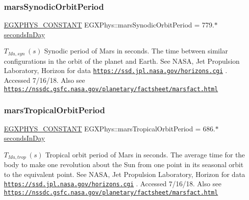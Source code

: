 \subsubsection{\texorpdfstring{mars\+Synodic\+Orbit\+Period}{marsSynodicOrbitPeriod}}
{\footnotesize\ttfamily \mbox{\hyperlink{group___e_g_x_phys-_constants-_macros_ga76980d288494ce1714c9ac68a95ba702}{E\+G\+X\+P\+H\+Y\+S\+\_\+\+C\+O\+N\+S\+T\+A\+NT}} E\+G\+X\+Phys\+::mars\+Synodic\+Orbit\+Period = 779.$\ast$\mbox{\hyperlink{namespace_e_g_x_phys_a93d2a00d75411b58cbf63ab3fd1f8bc2}{seconds\+In\+Day}}}

$ T_{Ma,syn} \ (s)$ Synodic period of Mars in seconds. The time between similar configurations in the orbit of the planet and Earth. See N\+A\+SA, Jet Propulsion Laboratory, Horizon for data \href{https://ssd.jpl.nasa.gov/horizons.cgi}{\tt https\+://ssd.\+jpl.\+nasa.\+gov/horizons.\+cgi} . Accessed 7/16/18. Also see \href{https://nssdc.gsfc.nasa.gov/planetary/factsheet/marsfact.html}{\tt https\+://nssdc.\+gsfc.\+nasa.\+gov/planetary/factsheet/marsfact.\+html} \mbox{\label{group___e_g_x_phys-_constants-_astrophysics-_solar_system-_mars-_orbit_ga9e1a81e54fd81e73f73d068fb0e0c4a6}} 
\subsubsection{\texorpdfstring{mars\+Tropical\+Orbit\+Period}{marsTropicalOrbitPeriod}}
{\footnotesize\ttfamily \mbox{\hyperlink{group___e_g_x_phys-_constants-_macros_ga76980d288494ce1714c9ac68a95ba702}{E\+G\+X\+P\+H\+Y\+S\+\_\+\+C\+O\+N\+S\+T\+A\+NT}} E\+G\+X\+Phys\+::mars\+Tropical\+Orbit\+Period = 686.$\ast$\mbox{\hyperlink{namespace_e_g_x_phys_a93d2a00d75411b58cbf63ab3fd1f8bc2}{seconds\+In\+Day}}}

$ T_{Ma,trop} \ (s)$ Tropical orbit period of Mars in seconds. The average time for the body to make one revolution about the Sun from one point in its seasonal orbit to the equivalent point. See N\+A\+SA, Jet Propulsion Laboratory, Horizon for data \href{https://ssd.jpl.nasa.gov/horizons.cgi}{\tt https\+://ssd.\+jpl.\+nasa.\+gov/horizons.\+cgi} . Accessed 7/16/18. Also see \href{https://nssdc.gsfc.nasa.gov/planetary/factsheet/marsfact.html}{\tt https\+://nssdc.\+gsfc.\+nasa.\+gov/planetary/factsheet/marsfact.\+html} 
